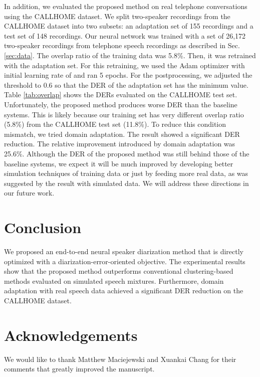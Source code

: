 \documentclass[a4paper]{article}
\begin{document}
In addition,
we evaluated the proposed method on real telephone conversations using the CALLHOME dataset.
We split two-speaker recordings from the CALLHOME dataset into two subsets: an adaptation set of 155 recordings and a test set of 148 recordings.
Our neural network was trained with a set of 26,172 two-speaker recordings from telephone speech recordings as described in Sec.\ref{sec:data}. The overlap ratio of the training data was 5.8\%.
Then, it was retrained with the adaptation set.
For this retraining, we used the Adam optimizer with initial learning rate of  and ran 5 epochs.
For the postprocessing, we adjusted the threshold to 0.6 so that the DER of the adaptation set has the minimum value.
Table \ref{tab:overlap} shows the DERs evaluated on the CALLHOME test set.
Unfortunately, the proposed method produces worse DER than the baseline systems.
This is likely because our training set has very different overlap ratio (5.8\%) from the CALLHOME test set (11.8\%).
To reduce this condition mismatch, we tried domain adaptation.
The result showed a significant DER reduction.
The relative improvement introduced by domain adaptation was 25.6\%.
Although the DER of the proposed method was still behind those of the baseline systems, we expect it will be much improved by developing better simulation techniques of training data or just by feeding more real data, as was suggested by the result with simulated data.
We will address these directions in our future work.







\section{Conclusion}

We proposed an end-to-end neural speaker diarization method that is directly optimized with a diarization-error-oriented objective.
The experimental results show that the proposed method outperforms conventional clustering-based methods evaluated on simulated speech mixtures.
Furthermore, domain adaptation with real speech data achieved a significant DER reduction on the CALLHOME dataset.

\section{Acknowledgements}

We would like to thank Matthew Maciejewski and Xuankai Chang for their
comments that greatly improved the manuscript.




\end{document}
